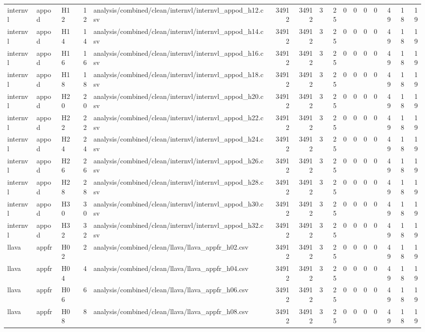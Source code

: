 \begin{longtable}{lllrlrrrrrrrrrrr}
internvl & appod & H12 & 12 & analysis/combined/clean/internvl/internvl\_appod\_h12.csv & 34912 & 34912 & 3 & 25 & 0 & 0 & 0 & 0 & 49 & 18 & 19 \\
internvl & appod & H14 & 14 & analysis/combined/clean/internvl/internvl\_appod\_h14.csv & 34912 & 34912 & 3 & 25 & 0 & 0 & 0 & 0 & 49 & 18 & 19 \\
internvl & appod & H16 & 16 & analysis/combined/clean/internvl/internvl\_appod\_h16.csv & 34912 & 34912 & 3 & 25 & 0 & 0 & 0 & 0 & 49 & 18 & 19 \\
internvl & appod & H18 & 18 & analysis/combined/clean/internvl/internvl\_appod\_h18.csv & 34912 & 34912 & 3 & 25 & 0 & 0 & 0 & 0 & 49 & 18 & 19 \\
internvl & appod & H20 & 20 & analysis/combined/clean/internvl/internvl\_appod\_h20.csv & 34912 & 34912 & 3 & 25 & 0 & 0 & 0 & 0 & 49 & 18 & 19 \\
internvl & appod & H22 & 22 & analysis/combined/clean/internvl/internvl\_appod\_h22.csv & 34912 & 34912 & 3 & 25 & 0 & 0 & 0 & 0 & 49 & 18 & 19 \\
internvl & appod & H24 & 24 & analysis/combined/clean/internvl/internvl\_appod\_h24.csv & 34912 & 34912 & 3 & 25 & 0 & 0 & 0 & 0 & 49 & 18 & 19 \\
internvl & appod & H26 & 26 & analysis/combined/clean/internvl/internvl\_appod\_h26.csv & 34912 & 34912 & 3 & 25 & 0 & 0 & 0 & 0 & 49 & 18 & 19 \\
internvl & appod & H28 & 28 & analysis/combined/clean/internvl/internvl\_appod\_h28.csv & 34912 & 34912 & 3 & 25 & 0 & 0 & 0 & 0 & 49 & 18 & 19 \\
internvl & appod & H30 & 30 & analysis/combined/clean/internvl/internvl\_appod\_h30.csv & 34912 & 34912 & 3 & 25 & 0 & 0 & 0 & 0 & 49 & 18 & 19 \\
internvl & appod & H32 & 32 & analysis/combined/clean/internvl/internvl\_appod\_h32.csv & 34912 & 34912 & 3 & 25 & 0 & 0 & 0 & 0 & 49 & 18 & 19 \\
llava & appfr & H02 & 2 & analysis/combined/clean/llava/llava\_appfr\_h02.csv & 34912 & 34912 & 3 & 25 & 0 & 0 & 0 & 0 & 49 & 18 & 19 \\
llava & appfr & H04 & 4 & analysis/combined/clean/llava/llava\_appfr\_h04.csv & 34912 & 34912 & 3 & 25 & 0 & 0 & 0 & 0 & 49 & 18 & 19 \\
llava & appfr & H06 & 6 & analysis/combined/clean/llava/llava\_appfr\_h06.csv & 34912 & 34912 & 3 & 25 & 0 & 0 & 0 & 0 & 49 & 18 & 19 \\
llava & appfr & H08 & 8 & analysis/combined/clean/llava/llava\_appfr\_h08.csv & 34912 & 34912 & 3 & 25 & 0 & 0 & 0 & 0 & 49 & 18 & 19 \\

\end{longtable}
